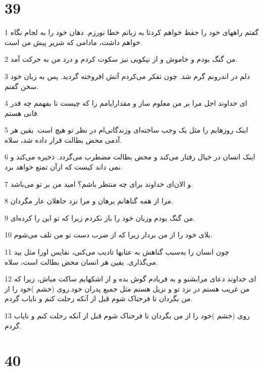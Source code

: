 \chapter{39}

\par 1 گفتم راههای خود را حفظ خواهم کردتا به زبانم خطا نورزم. دهان خود را به لجام نگاه خواهم داشت، مادامی که شریر پیش من است.
\par 2 من گنگ بودم و خاموش و از نیکویی نیز سکوت کردم و درد من به حرکت آمد.
\par 3 دلم در اندرونم گرم شد. چون تفکر می‌کردم آتش افروخته گردید. پس به زبان خود سخن گفتم.
\par 4 ‌ای خداوند اجل مرا بر من معلوم ساز و مقدارایامم را که چیست تا بفهمم چه قدر فانی هستم.
\par 5 اینک روزهایم را مثل یک وجب ساخته‌ای وزندگانی‌ام در نظر تو هیچ است. یقین هر آدمی محض بطالت قرار داده شد، سلاه.
\par 6 اینک انسان در خیال رفتار می‌کند و محض بطالت مضطرب می‌گردد. ذخیره می‌کند و نمی داند کیست که ازآن تمتع خواهد برد.
\par 7 و الان‌ای خداوند برای چه منتظر باشم؟ امید من بر تو می‌باشد.
\par 8 مرا از همه گناهانم برهان و مرا نزد جاهلان عار مگردان.
\par 9 من گنگ بودم وزبان خود را باز نکردم زیرا که تو این را کرده‌ای.
\par 10 بلای خود را از من بردار زیرا که از ضرب دست تو من تلف می‌شوم.
\par 11 چون انسان را به‌سبب گناهش به عتابها تادیب می‌کنی، نفایس اورا مثل بید می‌گذاری. یقین هر انسان محض بطالت است، سلاه.
\par 12 ‌ای خداوند دعای مرابشنو و به فریادم گوش بده و از اشکهایم ساکت مباش، زیرا که من غریب هستم در نزد تو و نزیل هستم مثل جمیع پدران خود.روی (خشم )خود را از من بگردان تا فرحناک شوم قبل از آنکه رحلت کنم و نایاب گردم.
\par 13 روی (خشم )خود را از من بگردان تا فرحناک شوم قبل از آنکه رحلت کنم و نایاب گردم.
 
\chapter{40}

